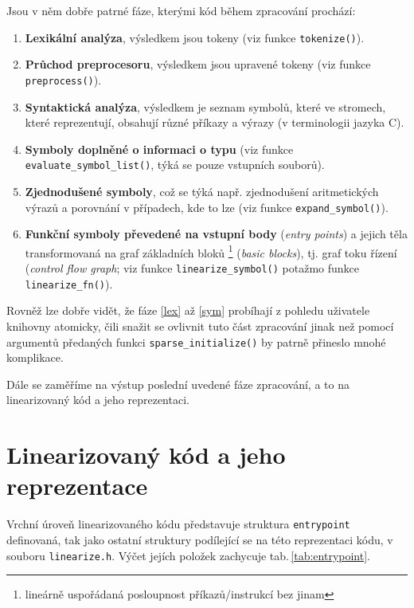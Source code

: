 Jsou v něm dobře patrné fáze, kterými kód během zpracování prochází:
\begin{enumerate}
    \item\label{lex} \textbf{Lexikální analýza}, výsledkem jsou tokeny (viz funkce \texttt{tokenize()}).
    \item \textbf{Průchod preprocesoru}, výsledkem jsou upravené tokeny (viz funkce \texttt{preprocess()}).
    \item \textbf{Syntaktická analýza}, výsledkem je seznam symbolů,
          které ve stromech, které reprezentují, obsahují různé
          příkazy a výrazy (v terminologii jazyka C).
    \item\label{sym} \textbf{Symboly doplněné o informaci o typu} (viz funkce \texttt{evaluate\_symbol\_list()},
          týká se pouze vstupních souborů).
    \item \textbf{Zjednodušené symboly}, což se týká např. zjednodušení aritmetických výrazů
          a porovnání v případech, kde to lze (viz funkce \texttt{expand\_symbol()}).
    \item \textbf{Funkční symboly převedené na vstupní body} (\emph{entry points})
          a jejich těla transformovaná na graf základních bloků%
          \footnote{lineárně uspořádaná posloupnost příkazů/instrukcí bez  jinam}
          (\emph{basic blocks}), tj. graf toku řízení (\emph{control flow graph};
          viz funkce \texttt{linearize\_symbol()} potažmo funkce \texttt{linearize\_fn()}).
\end{enumerate}

Rovněž lze dobře vidět, že fáze \ref{lex} až \ref{sym} probíhají z pohledu
uživatele knihovny atomicky, čili snažit se ovlivnit tuto část zpracování
jinak než pomocí argumentů předaných funkci \texttt{sparse\_initialize()}
by patrně přineslo mnohé komplikace.

Dále se zaměříme na výstup poslední uvedené fáze zpracování, a to na linearizovaný
kód a jeho reprezentaci.

\section{Linearizovaný kód a jeho reprezentace}

Vrchní úroveň linearizovaného kódu představuje struktura \texttt{entrypoint}
definovaná, tak jako ostatní struktury podílející se na této
reprezentaci kódu, v souboru \texttt{linearize.h}. Výčet jejích položek
zachycuje tab.\,\ref{tab:entrypoint}.

